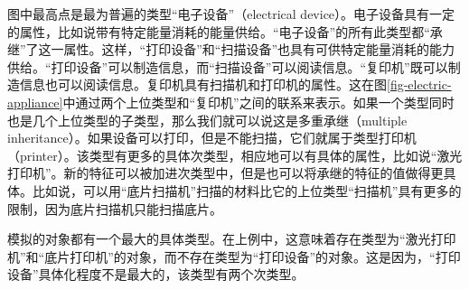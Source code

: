 图中最高点是最为普遍的类型“电子设备”（electrical device）。电子设备具有一定的属性，比如说带有特定能量消耗的能量供给。“电子设备”的所有此类型都“承继”了这一属性。这样，“打印设备”和“扫描设备”也具有可供特定能量消耗的能力供给。“打印设备”可以制造信息，而“扫描设备”可以阅读信息。“复印机”既可以制造信息也可以阅读信息。复印机具有扫描机和打印机的属性。这在图\ref{fig-electric-appliance}中通过两个上位类型和“复印机”之间的联系来表示。如果一个类型同时也是几个上位类型的子类型，那么我们就可以说这是多重承继（multiple inheritance）。如果设备可以打印，但是不能扫描，它们就属于类型打印机（printer）。该类型有更多的具体次类型，相应地可以有具体的属性，比如说“激光打印机”。新的特征可以被加进次类型中，但是也可以将承继的特征的值做得更具体。比如说，可以用“底片扫描机”扫描的材料比它的上位类型“扫描机”具有更多的限制，因为底片扫描机只能扫描底片。

模拟的对象都有一个最大的具体类型。在上例中，这意味着存在类型为“激光打印机”和“底片打印机”的对象，而不存在类型为“打印设备”的对象。这是因为，“打印设备”具体化程度不是最大的，该类型有两个次类型。

